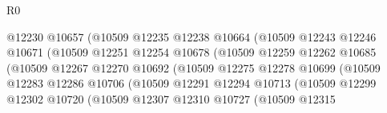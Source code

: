 \begin{lexlean}{R0}
\begin{coremodule}
                                          @12230
                                          @10657
                                          (@10509
                                            @12235
                                            @12238
                                            @10664
                                            (@10509
                                              @12243
                                              @12246
                                              @10671
                                              (@10509
                                                @12251
                                                @12254
                                                @10678
                                                (@10509
                                                  @12259
                                                  @12262
                                                  @10685
                                                  (@10509
                                                    @12267
                                                    @12270
                                                    @10692
                                                    (@10509
                                                      @12275
                                                      @12278
                                                      @10699
                                                      (@10509
                                                        @12283
                                                        @12286
                                                        @10706
                                                        (@10509
                                                          @12291
                                                          @12294
                                                          @10713
                                                          (@10509
                                                            @12299
                                                            @12302
                                                            @10720
                                                            (@10509
                                                              @12307
                                                              @12310
                                                              @10727
                                                              (@10509
                                                                @12315

\end{coremodule}
\end{lexlean}
